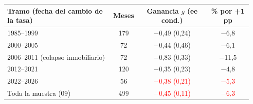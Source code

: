 \begin{tabular}{lccc}
\toprule
Tramo (fecha del cambio de la tasa) & Meses & Ganancia $g$ (ee cond.) & \% por +1 pp
\\ \midrule
1985--1999 & 179 & \ensuremath{-}0{,}49 (0{,}24) & \ensuremath{-}6{,}8 \\
2000--2005 & 72 & \ensuremath{-}0{,}44 (0{,}46) & \ensuremath{-}6{,}1 \\
2006--2011 (colapso inmobiliario) & 72 & \ensuremath{-}0{,}83 (0{,}33) & \ensuremath{-}11{,}5 \\
2012--2021 & 120 & \ensuremath{-}0{,}35 (0{,}23) & \ensuremath{-}4{,}8 \\
2022--2026 & 56 & \textcolor{red}{\ensuremath{-}0{,}38 (0{,}21)} & \textcolor{red}{\ensuremath{-}5{,}3} \\
Toda la muestra (09) & 499 & \textcolor{red}{\ensuremath{-}0{,}45 (0{,}11)} & \textcolor{red}{\ensuremath{-}6{,}3} \\
\bottomrule
\end{tabular}
